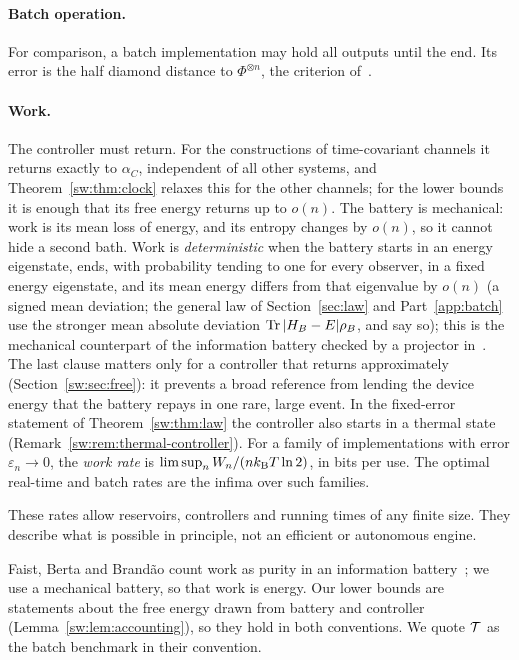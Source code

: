 \paragraph{Batch operation.} For comparison, a batch implementation may hold all outputs until the end. Its error is the half diamond distance to $\Phi^{\otimes n}$, the criterion of~\cite{FBB21}.

\paragraph{Work.} The controller must return. For the constructions of time-covariant channels it returns exactly to $\alpha_C$, independent of all other systems, and Theorem~\ref{sw:thm:clock} relaxes this for the other channels; for the lower bounds it is enough that its free energy returns up to $o(n)$. The battery is mechanical: work is its mean loss of energy, and its entropy changes by $o(n)$, so it cannot hide a second bath. Work is \emph{deterministic} when the battery starts in an energy eigenstate, ends, with probability tending to one for every observer, in a fixed energy eigenstate, and its mean energy differs from that eigenvalue by $o(n)$ (a signed mean deviation; the general law of Section~\ref{sec:law} and Part~\ref{app:batch} use the stronger mean absolute deviation $\operatorname{Tr}|H_B-E|\rho_B$, and say so); this is the mechanical counterpart of the information battery checked by a projector in~\cite{FR18,FBB21}. The last clause matters only for a controller that returns approximately (Section~\ref{sw:sec:free}): it prevents a broad reference from lending the device energy that the battery repays in one rare, large event. In the fixed-error statement of Theorem~\ref{sw:thm:law} the controller also starts in a thermal state (Remark~\ref{sw:rem:thermal-controller}). For a family of implementations with error $\varepsilon_n\to0$, the \emph{work rate} is $\limsup_n W_n/(nk_{\mathrm B} T\ln 2)$, in bits per use. The optimal real-time and batch rates are the infima over such families.

These rates allow reservoirs, controllers and running times of any finite size. They describe what is possible in principle, not an efficient or autonomous engine.

\begin{remark}\label{sw:rem:battery}
Faist, Berta and Brand\~ao count work as purity in an information battery~\cite{FR18,FBB21}; we use a mechanical battery, so that work is energy. Our lower bounds are statements about the free energy drawn from battery and controller (Lemma~\ref{sw:lem:accounting}), so they hold in both conventions. We quote $\mathcal T$ as the batch benchmark in their convention.
\end{remark}

